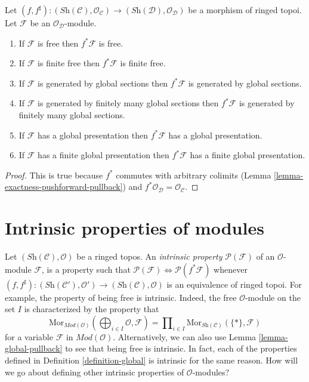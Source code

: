 \begin{lemma}
\label{lemma-global-pullback}
Let
$(f, f^\sharp) :
(\textit{Sh}(\mathcal{C}), \mathcal{O}_{\mathcal{C}})
\to
(\textit{Sh}(\mathcal{D}), \mathcal{O}_{\mathcal{D}})$
be a morphism of ringed topoi.
Let $\mathcal{F}$ be an $\mathcal{O}_{\mathcal{D}}$-module.
\begin{enumerate}
\item If $\mathcal{F}$ is free then $f^*\mathcal{F}$ is free.
\item If $\mathcal{F}$ is finite free then $f^*\mathcal{F}$ is finite free.
\item If $\mathcal{F}$ is generated by global sections
then $f^*\mathcal{F}$ is generated by global sections.
\item If $\mathcal{F}$ is generated by finitely many global sections
then $f^*\mathcal{F}$ is generated by finitely many global sections.
\item If $\mathcal{F}$ has a global presentation then
$f^*\mathcal{F}$ has a global presentation.
\item If $\mathcal{F}$ has a finite global presentation
then $f^*\mathcal{F}$ has a finite global presentation.
\end{enumerate}
\end{lemma}

\begin{proof}
This is true because $f^*$ commutes with arbitrary colimits
(Lemma \ref{lemma-exactness-pushforward-pullback})
and $f^*\mathcal{O}_{\mathcal{D}} = \mathcal{O}_{\mathcal{C}}$.
\end{proof}






\section{Intrinsic properties of modules}
\label{section-intrinsic}

\noindent
Let $(\textit{Sh}(\mathcal{C}), \mathcal{O})$ be a ringed topos.
An {\it intrinsic property} $\mathcal{P}(\mathcal{F})$
of an $\mathcal{O}$-module $\mathcal{F}$, is a property
such that
$\mathcal{P}(\mathcal{F}) \Leftrightarrow \mathcal{P}(f^*\mathcal{F})$
whenever $(f, f^\sharp) :
(\textit{Sh}(\mathcal{C}'), \mathcal{O}')
\to
(\textit{Sh}(\mathcal{C}), \mathcal{O})$
is an equivalence of ringed topoi.
For example, the property of being free is intrinsic. Indeed, the free
$\mathcal{O}$-module on the set $I$ is characterized by the property
that
$$
\text{Mor}_{\textit{Mod}(\mathcal{O})}(
\bigoplus\nolimits_{i \in I} \mathcal{O},
\mathcal{F})
=
\prod\nolimits_{i \in I} \text{Mor}_{\textit{Sh}(\mathcal{C})}(\{*\},
\mathcal{F})
$$
for a variable $\mathcal{F}$ in $\textit{Mod}(\mathcal{O})$.
Alternatively, we can also use Lemma \ref{lemma-global-pullback}
to see that being free is intrinsic. In fact, each of the properties
defined in Definition \ref{definition-global} is intrinsic for the
same reason.
How will we go about defining other intrinsic properties of
$\mathcal{O}$-modules?

